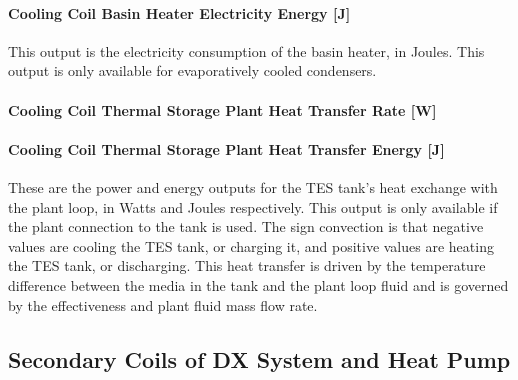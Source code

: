 \paragraph{Cooling Coil Basin Heater Electricity Energy {[}J{]}}\label{cooling-coil-basin-heater-electric-energy-j-2}

This output is the electricity consumption of the basin heater, in Joules. This output is only available for evaporatively cooled condensers.

\paragraph{Cooling Coil Thermal Storage Plant Heat Transfer Rate {[}W{]}}\label{cooling-coil-thermal-storage-plant-heat-transfer-rate-w}

\paragraph{Cooling Coil Thermal Storage Plant Heat Transfer Energy {[}J{]}}\label{cooling-coil-thermal-storage-plant-heat-transfer-energy-j}

These are the power and energy outputs for the TES tank's heat exchange with the plant loop, in Watts and Joules respectively. This output is only available if the plant connection to the tank is used. The sign convection is that negative values are cooling the TES tank, or charging it, and positive values are heating the TES tank, or discharging. This heat transfer is driven by the temperature difference between the media in the tank and the plant loop fluid and is governed by the effectiveness and plant fluid mass flow rate.

\subsection{Secondary Coils of DX System and Heat Pump}\label{secondary-coils-of-dx-system-and-heat-pump}

